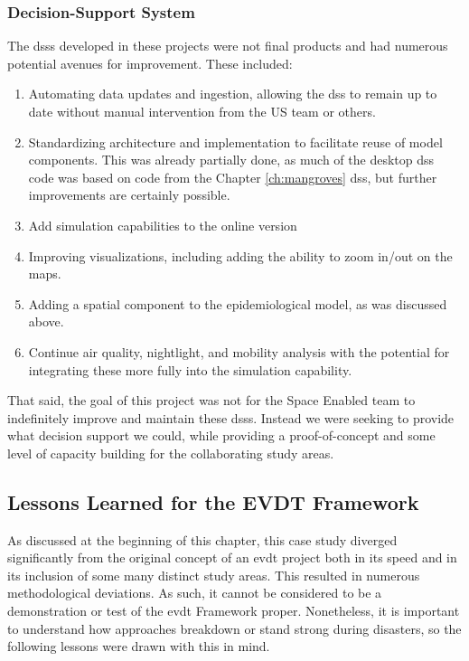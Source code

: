 \subsubsection{Decision-Support System}

The \acp{dss} developed in these projects were not final products and had numerous potential avenues for improvement. These included:

\begin{enumerate}[itemsep=0pt,parsep=0pt]
    \item Automating data updates and ingestion, allowing the \ac{dss} to remain up to date without manual intervention from the US team or others. 
    \item Standardizing architecture and implementation to facilitate reuse of model components. This was already partially done, as much of the desktop \ac{dss} code was based on code from the Chapter \ref{ch:mangroves} \ac{dss}, but further improvements are certainly possible.
    \item Add simulation capabilities to the online version
    \item Improving visualizations, including adding the ability to zoom in/out on the maps.
    \item Adding a spatial component to the epidemiological model, as was discussed above.
    \item Continue air quality, nightlight, and mobility analysis with the potential for integrating these more fully into the simulation capability. 
\end{enumerate}

That said, the goal of this project was not for the Space Enabled team to indefinitely improve and maintain these \acp{dss}. Instead we were seeking to provide what decision support we could, while providing a proof-of-concept and some level of capacity building for the collaborating study areas. 

\subsection{Lessons Learned for the EVDT Framework} \label{sec:vida-lessons}

As discussed at the beginning of this chapter, this case study diverged significantly from the original concept of an \ac{evdt} project both in its speed and in its inclusion of some many distinct study areas. This resulted in numerous methodological deviations. As such, it cannot be considered to be a demonstration or test of the \ac{evdt} Framework proper. Nonetheless, it is important to understand how approaches breakdown or stand strong during disasters, so the following lessons were drawn with this in mind.

